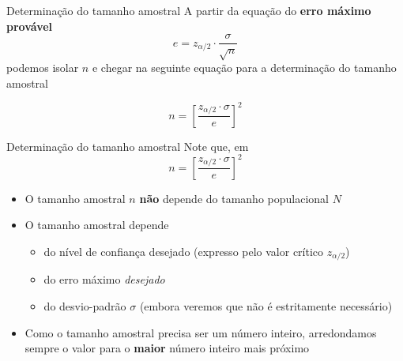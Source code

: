 \documentclass[10pt]{beamer}\usepackage[]{graphicx}\usepackage[]{color}
\theoremstyle{definition}
\begin{document}
\begin{frame}{Determinação do tamanho amostral}
  A partir da equação do \textbf{erro máximo provável}
  \begin{equation*}
    e = z_{\alpha/2} \cdot \frac{\sigma}{\sqrt{n}}
  \end{equation*}
  podemos isolar $n$ e chegar na seguinte equação para a determinação do
  tamanho amostral

  \begin{equation*}
    n = \left[ \frac{z_{\alpha/2} \cdot \sigma}{e} \right]^2
  \end{equation*}
\end{frame}

\begin{frame}{Determinação do tamanho amostral}
  Note que, em
  \begin{equation*}
    n = \left[ \frac{z_{\alpha/2} \cdot \sigma}{e} \right]^2
  \end{equation*}
  \begin{itemize}
  \item O tamanho amostral $n$ \textbf{não} depende do tamanho
    populacional $N$
  \item O tamanho amostral depende
    \begin{itemize}
    \item do nível de confiança desejado (expresso pelo valor crítico
      $z_{\alpha/2}$)
    \item do erro máximo \textsl{desejado}
    \item do desvio-padrão $\sigma$ (embora veremos que não é
      estritamente necessário)
    \end{itemize}
  \item Como o tamanho amostral precisa ser um número inteiro,
    arredondamos sempre o valor para o \textbf{maior} número inteiro
    mais próximo
  \end{itemize}
\end{frame}
\end{document}
